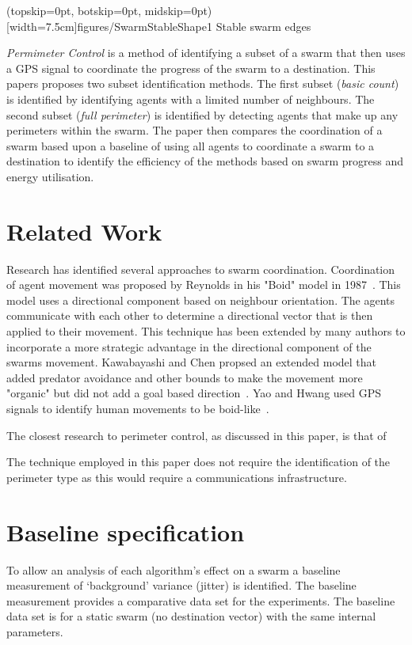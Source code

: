 \documentclass{ieeeaccess}
\begin{document}
\Figure[t!](topskip=0pt, botskip=0pt, midskip=0pt)[width=7.5cm]{figures/SwarmStableShape1}
{Stable swarm edges\label{concave:SwarmStableShape1}}

\textit{Permimeter Control} is a method of identifying a subset of a swarm that then uses a GPS signal to coordinate the progress of the swarm to a destination. This papers proposes two subset identification methods. The first subset (\textit{basic count}) is identified by identifying agents with a limited number of neighbours. The second subset (\textit{full perimeter}) is identified by detecting agents that make up any perimeters within the swarm. The paper then compares the coordination of a swarm based upon a baseline of using all agents to coordinate a swarm to a destination to identify the efficiency of the methods based on swarm progress and energy utilisation. 

\section{Related Work}\label{sec:RelatedWork}
Research has identified several approaches to swarm coordination. Coordination of agent movement was proposed by Reynolds in his "Boid" model in 1987~\cite{REY:87}. This model uses a directional component based on neighbour orientation. The agents communicate with each other to determine a directional vector that is then applied to their movement. This technique has been extended by many authors to incorporate a more strategic advantage in the directional component of the swarms movement. Kawabayashi and Chen propsed an extended model that added predator avoidance and other bounds to make the movement more "organic" but did not add a goal based direction~\cite{KC:08}. Yao and Hwang used GPS signals to identify human movements to be boid-like~\cite{YH:14}. 


The closest research to perimeter control, as discussed in this paper, is that of 

The technique employed in this paper does not require the identification of the perimeter type as this would require a communications infrastructure.

\section{Baseline specification}
To allow an analysis of each algorithm's effect on a swarm a baseline measurement of `background' variance (jitter) is identified. The baseline measurement provides a comparative data set for the experiments. The baseline data set is for a static swarm (no destination vector) with the same internal parameters.
\end{document}
